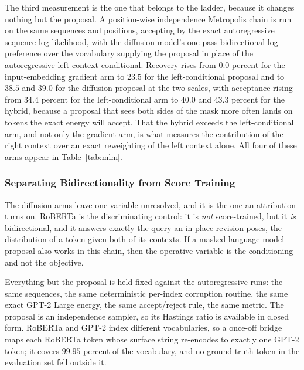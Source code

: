 The third measurement is the one that belongs to the ladder, because it changes nothing but the proposal. A position-wise independence Metropolis chain is run on the same sequences and positions, accepting by the exact autoregressive sequence log-likelihood, with the diffusion model's one-pass bidirectional log-preference over the vocabulary supplying the proposal in place of the autoregressive left-context conditional. Recovery rises from $0.0$ percent for the input-embedding gradient arm to $23.5$ for the left-conditional proposal and to $38.5$ and $39.0$ for the diffusion proposal at the two scales, with acceptance rising from $34.4$ percent for the left-conditional arm to $40.0$ and $43.3$ percent for the hybrid, because a proposal that sees both sides of the mask more often lands on tokens the exact energy will accept. %
That the hybrid exceeds the left-conditional arm, and not only the gradient arm, is what measures the contribution of the right context over an exact reweighting of the left context alone. All four of these arms appear in Table~\ref{tab:mlm}.

\subsubsection{Separating Bidirectionality from Score Training}
\label{sec:results-mlm}

The diffusion arms leave one variable unresolved, and it is the one an attribution turns on. RoBERTa \citep{liu2019roberta} is the discriminating control: it is \emph{not} score-trained, but it \emph{is} bidirectional, and it answers exactly the query an in-place revision poses, the distribution of a token given both of its contexts. If a masked-language-model proposal also works in this chain, then the operative variable is the conditioning and not the objective.

Everything but the proposal is held fixed against the autoregressive runs: the same sequences, the same deterministic per-index corruption routine, the same exact GPT-2 Large energy, the same accept/reject rule, the same metric. The proposal is an independence sampler, so its Hastings ratio is available in closed form. RoBERTa and GPT-2 index different vocabularies, so a once-off bridge maps each RoBERTa token whose surface string re-encodes to exactly one GPT-2 token; it covers $99.95$ percent of the vocabulary, and no ground-truth token in the evaluation set fell outside it.

